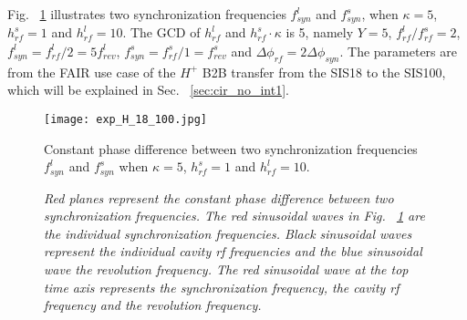 Fig. ~\ref{exp_H_18_100} illustrates two synchronization frequencies $f_{\mathit{syn}}^{l}$ and $f_{\mathit{syn}}^{s}$, when $\kappa=5$, $h^s_\mathit{rf}=1$ and $h^l_\mathit{rf}=10$. The GCD of $h^l_\mathit{rf}$ and $h^s_\mathit{rf} \cdot \kappa$ is 5, namely $Y=5$, $f_{\mathit{rf}}^{l}/f_{\mathit{rf}}^{s}=2$, $f_{\mathit{syn}}^{l}=f_{\mathit{rf}}^{l}/2=5f_{\mathit{rev}}^{l}$, $f_{\mathit{syn}}^{s}=f_{\mathit{rf}}^{s}/1=f_{\mathit{rev}}^{s}$ and $\Delta \phi_\mathit{rf}=2\Delta \phi_\mathit{syn}$.  The parameters are from the FAIR use case of the $H^{+}$ B2B transfer from the SIS18 to the SIS100, which will be explained in Sec. ~\ref{sec:cir_no_int1}.
\begin{figure}[!htb]
   \centering   
   \texttt{[image: exp\_H\_18\_100.jpg]}
	\caption{Constant phase difference between two synchronization frequencies $f_{\mathit{syn}}^{l}$ and $f_{\mathit{syn}}^{s}$ when $\kappa=5$, $h^s_\mathit{rf}=1$ and $h^l_\mathit{rf}=10$. }

	\caption*{\textsl{\small{Red planes represent the constant phase difference between two synchronization frequencies. The red sinusoidal waves in Fig. ~\ref{exp_H_18_100} are the individual synchronization frequencies. Black sinusoidal waves represent the individual cavity rf frequencies and the blue sinusoidal wave the revolution frequency. The red sinusoidal wave at the top time axis represents the synchronization frequency, the cavity rf frequency and the revolution frequency.}}}
   \label{exp_H_18_100}
\end{figure} 


